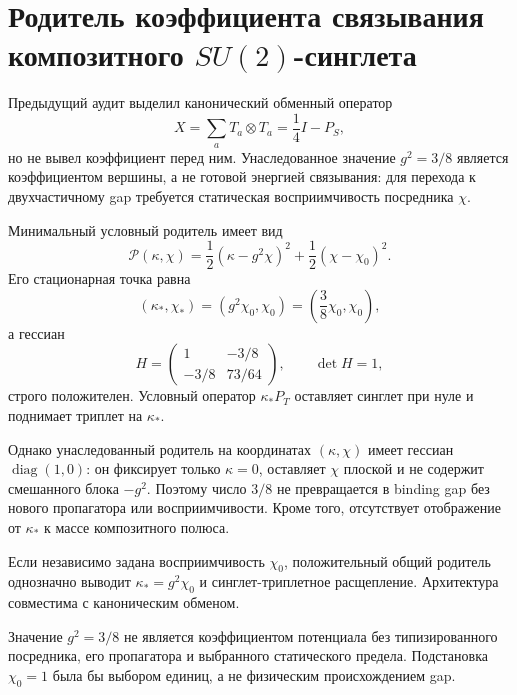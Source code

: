 \chapter{Родитель коэффициента связывания композитного
\texorpdfstring{$SU(2)$}{SU(2)}-синглета}
\label{ch:v10-discrete-resolution-su2-singlet-binding-coefficient}

Предыдущий аудит выделил канонический обменный оператор
\begin{equation}
 X=\sum_aT_a\otimes T_a=\frac14I-P_S,
\end{equation}
но не вывел коэффициент перед ним. Унаследованное значение $g^2=3/8$
является коэффициентом вершины, а не готовой энергией связывания: для
перехода к двухчастичному gap требуется статическая восприимчивость
посредника $\chi$.

Минимальный условный родитель имеет вид
\begin{equation}
 \mathcal P(\kappa,\chi)=\frac12(\kappa-g^2\chi)^2
 +\frac12(\chi-\chi_0)^2.
\end{equation}
Его стационарная точка равна
\begin{equation}
 (\kappa_*,\chi_*)=(g^2\chi_0,\chi_0)
 =\left(\frac38\chi_0,\chi_0\right),
\end{equation}
а гессиан
\begin{equation}
 H=\begin{pmatrix}1&-3/8\\-3/8&73/64\end{pmatrix},
 \qquad \det H=1,
\end{equation}
строго положителен. Условный оператор $\kappa_*P_T$ оставляет синглет при
нуле и поднимает триплет на $\kappa_*$.

Однако унаследованный родитель на координатах $(\kappa,\chi)$ имеет
гессиан $\operatorname{diag}(1,0)$: он фиксирует только
$\kappa=0$, оставляет $\chi$ плоской и не содержит смешанного блока
$-g^2$. Поэтому число $3/8$ не превращается в binding gap без нового
пропагатора или восприимчивости. Кроме того, отсутствует отображение от
$\kappa_*$ к массе композитного полюса.

\begin{theorem}
Если независимо задана восприимчивость $\chi_0$, положительный общий
родитель однозначно выводит $\kappa_*=g^2\chi_0$ и синглет-триплетное
расщепление. Архитектура совместима с каноническим обменом.
\end{theorem}

\begin{nogocriterion}
Значение $g^2=3/8$ не является коэффициентом потенциала без типизированного
посредника, его пропагатора и выбранного статического предела. Подстановка
$\chi_0=1$ была бы выбором единиц, а не физическим происхождением gap.
\end{nogocriterion}

